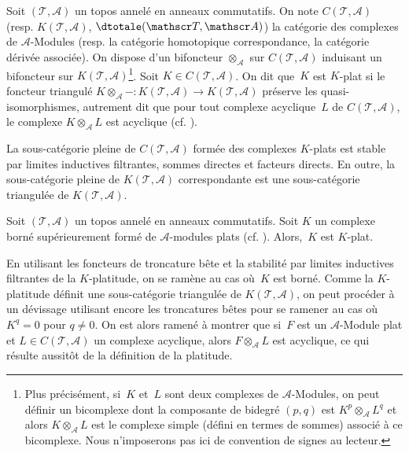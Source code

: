 \documentclass[10pt]{../fichiers-configuration-latex/smfart}
\begin{document}
\begin{definition2}
Soit $(\mathscr T,\mathscr A)$ un topos annelé en anneaux commutatifs. On
note $C(\mathscr T,\mathscr A)$ (resp. $K(\mathscr T,\mathscr A)$,
$\dtotale(\mathscr T,\mathscr A)$) la catégorie des complexes de $\mathscr
A$-Modules (resp. la catégorie homotopique correspondance, la catégorie
dérivée associée). On dispose d'un bifoncteur $\otimes_{\mathscr A}$ sur
$C(\mathscr T,\mathscr A)$ induisant un bifoncteur sur $K(\mathscr
T,\mathscr A)$\;\footnote{Plus précisément, si $K$ et $L$ sont deux
complexes de $\mathscr A$-Modules, on peut définir un bicomplexe dont la
composante de bidegré $(p,q)$ est $K^p\otimes_{\mathscr A}L^q$ et alors
$K\otimes_{\mathscr A} L$ est le complexe simple (défini en termes
de sommes) associé à ce bicomplexe. Nous n'imposerons pas ici de
convention de signes au lecteur.}.
Soit $K\in C(\mathscr T,\mathscr A)$. On dit que $K$ est
$K$-plat si le foncteur triangulé $K\otimes_{\mathscr A}-\colon K(\mathscr
T,\mathscr A)\to K(\mathscr T,\mathscr A)$ préserve les
quasi-isomorphismes, autrement dit que pour tout complexe acyclique $L$ de
$C(\mathscr T,\mathscr A)$, le complexe $K\otimes_{\mathscr A} L$ est
acyclique (cf. \cite[definition~5.1]{RUC@Spaltenstein}).
\end{definition2}

La sous-catégorie pleine de $C(\mathscr T,\mathscr A)$ formée des complexes
$K$-plats est stable par limites inductives filtrantes, sommes directes et
facteurs directs. En outre, la sous-catégorie pleine de $K(\mathscr
T,\mathscr A)$ correspondante est une sous-catégorie triangulée de
$K(\mathscr T,\mathscr A)$.

\begin{proposition2}
Soit $(\mathscr T,\mathscr A)$ un topos annelé en anneaux commutatifs. Soit
$K$ un complexe borné supérieurement formé de $\mathscr A$-modules plats
(cf. ). Alors, $K$ est $K$-plat.
\end{proposition2}

En utilisant les foncteurs de troncature bête et la stabilité par limites
inductives filtrantes de la $K$-platitude, on se ramène au cas où $K$ est
borné. Comme la $K$-platitude définit une
sous-catégorie triangulée de $K(\mathscr T,\mathscr A)$, on peut procéder à
un dévissage utilisant encore les troncatures bêtes pour se ramener au cas
où $K^q=0$ pour $q\neq 0$. On est alors ramené à montrer que si $F$ est un
$\mathscr A$-Module plat et $L\in C(\mathscr T,\mathscr A)$ un complexe
acyclique, alors $F\otimes_{\mathscr A}L$ est acyclique, ce qui résulte
aussitôt de la définition de la platitude.
\end{document}
